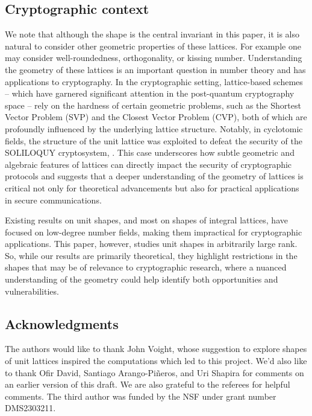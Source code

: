 \documentclass{amsart}
\numberwithin{equation}{section}
\begin{document}
\subsection{Cryptographic context}\label{contextsection}


We note that although the shape is the central invariant in this paper, it is also natural to consider other geometric properties of these lattices. For example one may consider well-roundedness, orthogonality, or kissing number. Understanding the geometry of these lattices is an important question in number theory and has applications to cryptography. In the cryptographic setting, lattice-based schemes -- which have garnered significant attention in the post-quantum cryptography space -- rely on the hardness of certain geometric problems, such as the Shortest Vector Problem (SVP) and the Closest Vector Problem (CVP), both of which are profoundly influenced by the underlying lattice structure. Notably, in cyclotomic fields, the structure of the unit lattice was exploited to defeat the security of the SOLILOQUY cryptosystem, \cite{sililoquy}. This case underscores how subtle geometric and algebraic features of lattices can directly impact the security of cryptographic protocols and suggests that a deeper understanding of the geometry of lattices is critical not only for theoretical advancements but also for practical applications in secure communications.

Existing results on unit shapes, and most on shapes of integral lattices, have focused on low-degree number fields, making them impractical for cryptographic applications. This paper, however, studies unit shapes in arbitrarily large rank. So, while our results are primarily theoretical, they highlight restrictions in the shapes that may be of relevance to cryptographic research, where a nuanced understanding of the geometry could help identify both opportunities and vulnerabilities.

\subsection{Acknowledgments} 
The authors would like to thank John Voight, whose suggestion to explore shapes of unit lattices inspired the computations which led to this project. We'd also like to thank Ofir David,  Santiago Arango-Piñeros, and Uri Shapira for comments on an earlier version of this draft. We are also grateful to the referees for helpful comments. The third author was funded by the NSF under grant number DMS2303211.
\end{document}
